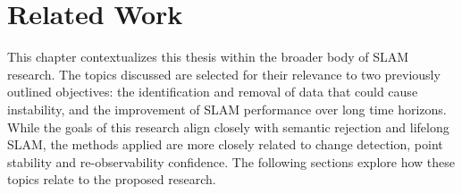 \section{Related Work}
\label{sec:related_work}

This chapter contextualizes this thesis within the broader body of SLAM research. The topics discussed are selected for their relevance to two previously outlined objectives: the identification and removal of data that could cause instability, and the improvement of SLAM performance over long time horizons. While the goals of this research align closely with semantic rejection and lifelong SLAM, the methods applied are more closely related to change detection, point stability and re-observability confidence. The following sections explore how these topics relate to the proposed research.

% 